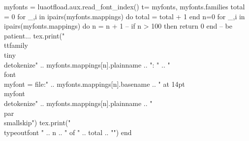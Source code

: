 \documentclass{article}
\begin{document}
 
 \begin{luacode}
   myfonts = luaotfload.aux.read_font_index()
   t={ myfonts, myfonts.families }
   total = 0
   for _,i in ipairs(myfonts.mappings) do
     total = total + 1
   end
   n=0
   for _,i in ipairs(myfonts.mappings) do
     n = n + 1
     -- if n > 100 then return 0 end -- be patient...
     tex.print("\\ttfamily\\tiny\\detokenize{"  .. myfonts.mappings[n].plainname .. "}: " ..
       "\\font\\myfont = {file:" .. myfonts.mappings[n].basename .. "} at 14pt \\myfont \\detokenize{" ..
       myfonts.mappings[n].plainname .. "}\\par\\smallskip")
     tex.print("\\typeout{font " .. n .. " of " .. total .. "}")
   end
 \end{luacode}
 
\end{document}
